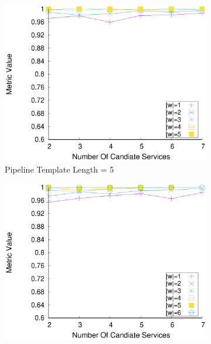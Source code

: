 \begin{figure}[ht!]
\begin{subfigure}{0.49\textwidth}
        \label{fig:quality_window_average_qualitative_n4}
      \end{subfigure}
      \hfill
      \begin{subfigure}{0.49\textwidth}
        \includegraphics[width=\textwidth]{Images/graphs/window_quality_performance_diff_qual_n7_s7_50_80_n5}
        \caption{Pipeline Template Length = 5}
        \label{fig:quality_window_average_qualitative_n5}
      \end{subfigure}
      \hfill
      \begin{subfigure}{0.49\textwidth}
        \includegraphics[width=\textwidth]{Images/graphs/window_quality_performance_diff_qual_n7_s7_50_80_n6}

\end{subfigure}
\end{figure}
